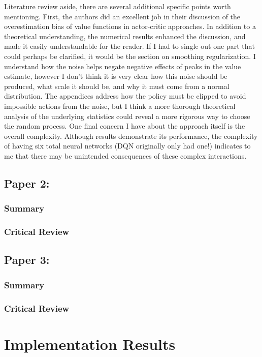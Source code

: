 \documentclass{article}
\begin{document}
Literature review aside, there are several additional specific points worth mentioning. First, the authors did an excellent job in their discussion of the overestimation bias of value functions in actor-critic approaches. In addition to a theoretical understanding, the numerical results enhanced the discussion, and made it easily understandable for the reader. If I had to single out one part that could perhaps be clarified, it would be the section on smoothing regularization. I understand how the noise helps negate negative effects of peaks in the value estimate, however I don't think it is very clear how this noise should be produced, what scale it should be, and why it must come from a normal distribution. The appendices address how the policy must be clipped to avoid impossible actions from the noise, but I think a more thorough theoretical analysis of the underlying statistics could reveal a more rigorous way to choose the random process. One final concern I have about the approach itself is the overall complexity. Although results demonstrate its performance, the complexity of having six total neural networks (DQN originally only had one!) indicates to me that there may be unintended consequences of these complex interactions.

\subsection{Paper 2: \citep{sac}}
\subsubsection{Summary}
\cite{sac}
\subsubsection{Critical Review}
\subsection{Paper 3: \citep{ofir}}
\subsubsection{Summary}
\subsubsection{Critical Review}

\section{Implementation Results}



\end{document}
